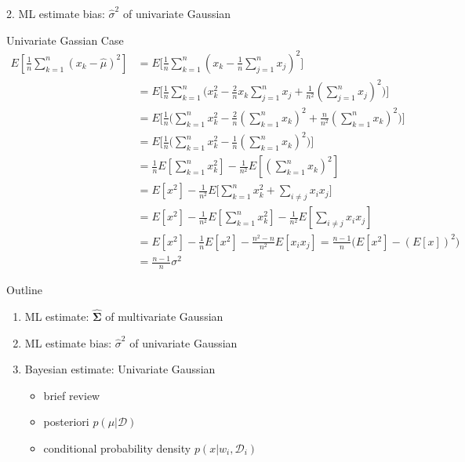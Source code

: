 \documentclass[compress,blue]{beamer}
\newcommand{\bSig}{\mathbf{\Sigma}}
\newcommand{\calD}{\mathcal{D}}
\begin{document}
\begin{frame}{2. ML estimate bias: $\hat{\sigma}^2$ of univariate Gaussian}
	\begin{block}{Univariate Gassian Case}
		\vspace{-0.15in}
		\tiny
		\begin{align}
			E[\frac{1}{n}\sum_{k=1}^{n}(x_k-\hat{\mu})^2] &= E\Big[\frac{1}{n}\sum_{k=1}^{n}(x_k-\frac{1}{n}\sum_{j=1}^n x_j)^2\Big]\\
			&=E\Big[\frac{1}{n}\sum_{k=1}^{n}\big(x^2_k -\frac{2}{n}x_k\sum_{j=1}^n x_j + \frac{1}{n^2}(\sum_{j=1}^n x_j)^2\big)\Big]\\
			&=E\Big[\frac{1}{n}\Big(\sum_{k=1}^{n} x^2_k -\frac{2}{n}(\sum_{k=1}^n x_k)^2 + \frac{n}{n^2}(\sum_{k=1}^n x_k)^2\Big)\Big]\\
			&=E\Big[\frac{1}{n}\Big(\sum_{k=1}^{n} x^2_k -\frac{1}{n}(\sum_{k=1}^n x_k)^2 \Big)\Big] \\
			&=\frac{1}{n}E[\sum_{k=1}^{n} x^2_k] - \frac{1}{n^2}E[(\sum_{k=1}^n x_k)^2]\\
			&=E[x^2] - \frac{1}{n^2}E\Big[\sum_{k=1}^n x_k^2 + \sum_{i\neq j}x_i x_j\Big] \\
			&= E[x^2] - \frac{1}{n^2}E[\sum_{k=1}^n x_k^2] - \frac{1}{n^2}E[\sum_{i\neq j}x_i x_j] \\
			&= E[x^2] -\frac{1}{n} E[x^2] - \frac{n^2-n}{n^2}E[x_i x_j] = \frac{n-1}{n}\Big(E[x^2] - (E[x])^2\Big)\\
			& = \frac{n-1}{n} \sigma^2
		\end{align}
		\normalsize
	\end{block}
\end{frame}

\begin{frame}{Outline}
	\begin{enumerate}
		\item<1-> ML estimate: $\hat{\bSig}$ of multivariate Gaussian 
		\vspace{0.1in}
		\item<1-> ML estimate bias: $\hat{\sigma}^2$ of univariate Gaussian
		\vspace{0.1in}
		\item<2-> Bayesian estimate: Univariate Gaussian
		\begin{itemize}
			\item<3-> brief review
			\item<0> posteriori $p(\mu|\calD)$
			\item<0> conditional probability density $p(x | w_i, \calD_i)$
		\end{itemize}
	\end{enumerate}
\end{frame}
\end{document}

